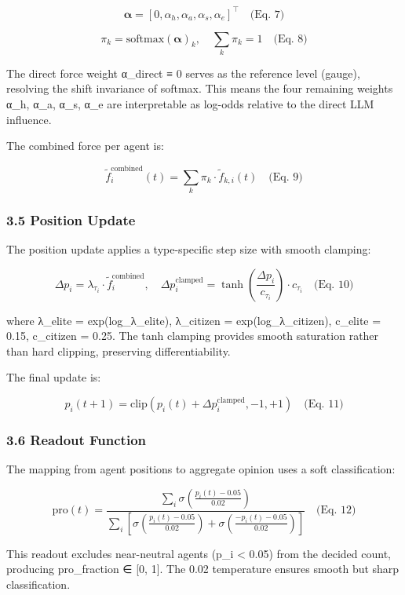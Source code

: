 \documentclass[
]{article}
\begin{document}
\[\boldsymbol{\alpha} = [0, \alpha_h, \alpha_a, \alpha_s, \alpha_e]^\top \quad \text{(Eq. 7)}\]

\[\pi_k = \text{softmax}(\boldsymbol{\alpha})_k, \quad \sum_k \pi_k = 1 \quad \text{(Eq. 8)}\]

The direct force weight α\_direct ≡ 0 serves as the reference level
(gauge), resolving the shift invariance of softmax. This means the four
remaining weights α\_h, α\_a, α\_s, α\_e are interpretable as log-odds
relative to the direct LLM influence.

The combined force per agent is:

\[\tilde{f}_i^{\text{combined}}(t) = \sum_k \pi_k \cdot \tilde{f}_{k,i}(t) \quad \text{(Eq. 9)}\]

\subsubsection{3.5 Position Update}\label{position-update}

The position update applies a type-specific step size with smooth
clamping:

\[\Delta p_i = \lambda_{\tau_i} \cdot \tilde{f}_i^{\text{combined}}, \quad \Delta p_i^{\text{clamped}} = \tanh\left(\frac{\Delta p_i}{c_{\tau_i}}\right) \cdot c_{\tau_i} \quad \text{(Eq. 10)}\]

where λ\_elite = exp(log\_λ\_elite), λ\_citizen = exp(log\_λ\_citizen),
c\_elite = 0.15, c\_citizen = 0.25. The tanh clamping provides smooth
saturation rather than hard clipping, preserving differentiability.

The final update is:

\[p_i(t+1) = \text{clip}(p_i(t) + \Delta p_i^{\text{clamped}}, -1, +1) \quad \text{(Eq. 11)}\]

\subsubsection{3.6 Readout Function}\label{readout-function}

The mapping from agent positions to aggregate opinion uses a soft
classification:

\[\text{pro}(t) = \frac{\sum_i \sigma\left(\frac{p_i(t) - 0.05}{0.02}\right)}{\sum_i \left[\sigma\left(\frac{p_i(t) - 0.05}{0.02}\right) + \sigma\left(\frac{-p_i(t) - 0.05}{0.02}\right)\right]} \quad \text{(Eq. 12)}\]

This readout excludes near-neutral agents (\textbar p\_i\textbar{}
\textless{} 0.05) from the decided count, producing pro\_fraction ∈
{[}0, 1{]}. The 0.02 temperature ensures smooth but sharp
classification.
\end{document}
